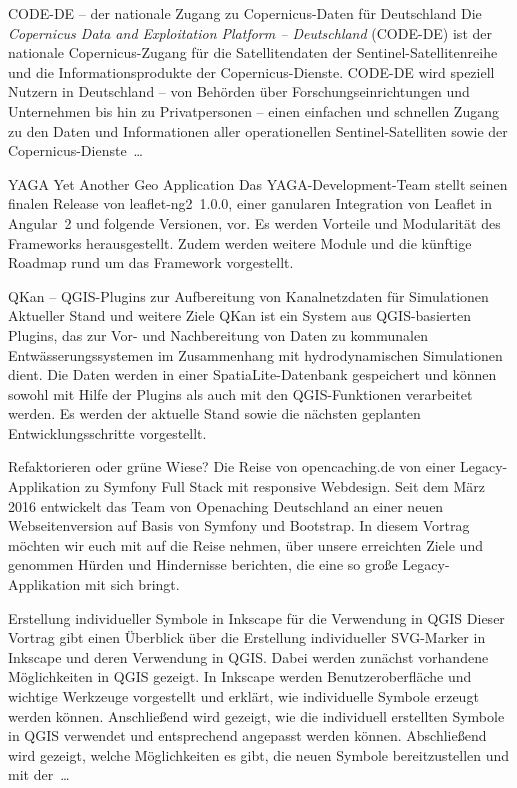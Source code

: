 %
{CODE-DE -- der nationale Zugang zu Copernicus-Daten für Deutschland}%
{}%
{%
Die \emph{Copernicus Data and Exploitation Platform -- Deutschland} (CODE-DE) ist der nationale
Copernicus-Zugang für die Satellitendaten der Sentinel-Satellitenreihe und die
Informationsprodukte der Copernicus-Dienste. CODE-DE wird speziell Nutzern in Deutschland -- von
Behörden über Forschungseinrichtungen und Unternehmen bis hin zu Privatpersonen -- einen einfachen
und schnellen Zugang zu den Daten und Informationen aller operationellen Sentinel-Satelliten sowie
der Copernicus-Dienste~\dots %
}


%
{YAGA}%
{Yet Another Geo Application}%
{%
Das YAGA-Development-Team stellt seinen finalen Release von leaflet-ng2~1.0.0, einer ganularen
Integration von Leaflet in Angular~2 und folgende Versionen, vor. Es werden Vorteile und Modularität
des Frameworks herausgestellt. Zudem werden weitere Module und die künftige Roadmap rund um das
Framework vorgestellt.%
}

%
{QKan -- QGIS-Plugins zur Aufbereitung von Kanalnetzdaten für Simulationen}%
{Aktueller Stand und weitere Ziele}%
{%
QKan ist ein System aus QGIS-basierten Plugins, das zur Vor- und Nachbereitung von Daten zu
kommunalen Entwässerungssystemen im Zusammenhang mit hydrodynamischen Simulationen dient. Die Daten
werden in einer SpatiaLite-Datenbank gespeichert und können sowohl mit Hilfe der Plugins als auch
mit den QGIS-Funktionen verarbeitet werden. Es werden der aktuelle Stand sowie die nächsten
geplanten Entwicklungsschritte vorgestellt.%
}

%
{Refaktorieren oder grüne Wiese?}%
{Die Reise von opencaching.de von einer Legacy-Applikation zu Symfony Full Stack mit responsive Webdesign.}%
{%
Seit dem März 2016 entwickelt das Team von Openaching Deutschland an einer neuen Webseitenversion
auf Basis von Symfony und Bootstrap. In diesem Vortrag möchten wir euch mit auf die Reise nehmen,
über unsere erreichten Ziele und genommen Hürden und Hindernisse berichten, die eine so große
Legacy-Applikation mit sich bringt.%
}


%
{Erstellung individueller Symbole in Inkscape für die Verwendung in QGIS}%
{}%
{%
Dieser Vortrag gibt einen Überblick über die Erstellung individueller SVG-Marker in Inkscape und
deren Verwendung in QGIS. Dabei werden zunächst vorhandene Möglichkeiten in QGIS gezeigt. In
Inkscape werden Benutzeroberfläche und wichtige Werkzeuge vorgestellt und erklärt, wie individuelle
Symbole erzeugt werden können. Anschließend wird gezeigt, wie die individuell erstellten Symbole in
QGIS verwendet und entsprechend angepasst werden können.  Abschließend wird gezeigt, welche
Möglichkeiten es gibt, die neuen Symbole bereitzustellen und  mit der~\dots%
}


